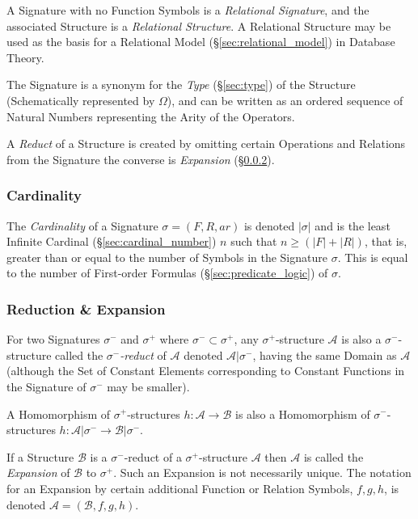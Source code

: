 A Signature with no Function Symbols is a \emph{Relational Signature},
and the associated Structure is a \emph{Relational Structure}. A
Relational Structure may be used as the basis for a Relational Model
(\S\ref{sec:relational_model}) in Database Theory.

The Signature is a synonym for the \emph{Type} (\S\ref{sec:type}) of
the Structure (Schematically represented by $\Omega$), and can be
written as an ordered sequence of Natural Numbers representing the
Arity of the Operators.

A \emph{Reduct} of a Structure is created by omitting certain
Operations and Relations from the Signature the converse is
\emph{Expansion} (\S\ref{sec:reduct_expansion}).



\subsubsection{Cardinality}\label{sec:signature_cardinality}

The \emph{Cardinality} of a Signature $\sigma = (F,R,ar)$ is denoted
$|\sigma|$ and is the least Infinite Cardinal
(\S\ref{sec:cardinal_number}) $n$ such that $n \geq (|F| + |R|)$, that
is, greater than or equal to the number of Symbols in the Signature
$\sigma$. This is equal to the number of First-order Formulas
(\S\ref{sec:predicate_logic}) of $\sigma$.



\subsubsection{Reduction \& Expansion}\label{sec:reduct_expansion}

For two Signatures $\sigma^-$ and $\sigma^+$ where $\sigma^- \subset
\sigma^+$, any $\sigma^+$-structure $\mathcal{A}$ is also a
$\sigma^-$-structure called the \emph{$\sigma^-$-reduct} of
$\mathcal{A}$ denoted $\mathcal{A}|\sigma^-$, having the same Domain
as $\mathcal{A}$ (although the Set of Constant Elements corresponding
to Constant Functions in the Signature of $\sigma^-$ may be smaller).

A Homomorphism of $\sigma^+$-structures $h : \mathcal{A} \rightarrow
\mathcal{B}$ is also a Homomorphism of $\sigma^-$-structures $h :
\mathcal{A} | \sigma^- \rightarrow \mathcal{B} | \sigma^-$.

If a Structure $\mathcal{B}$ is a $\sigma^-$-reduct of a
$\sigma^+$-structure $\mathcal{A}$ then $\mathcal{A}$ is called the
\emph{Expansion} of $\mathcal{B}$ to $\sigma^+$. Such an Expansion is
not necessarily unique. The notation for an Expansion by certain
additional Function or Relation Symbols, $f, g, h$, is denoted
$\mathcal{A} = (\mathcal{B}, f, g, h)$.



